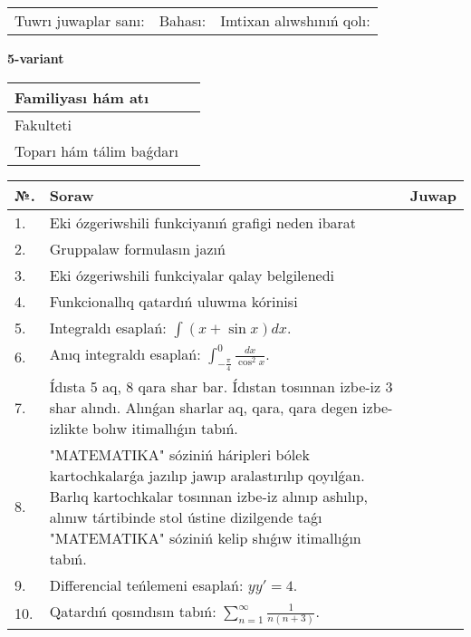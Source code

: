 \documentclass{article}
\begin{document}
\vspace{1cm}

\begin{tabular}{ c c c }
Tuwrı juwaplar sanı: \underline{\hspace{2cm}} & Bahası: \underline{\hspace{2cm}} & Imtixan alıwshınıń qolı: \underline{\hspace{2cm}} \\
\end{tabular}

\newpage

\begin{center}\textbf{5-variant}\end{center}

\bgroup
\def\arraystretch{1.5}
\begin{tabular}{ |m{6cm}|m{10cm}| }
  \hline
  Familiyası hám atı & \\
  \hline
  Fakulteti &\\
  \hline
  Toparı hám tálim baǵdarı & \\
  \hline
\end{tabular}
\egroup

\vspace{0.5cm}

\bgroup
\def\arraystretch{2}
\begin{tabular}{ |l|m{8cm}|m{7cm}| }
  \hline
  №. & Soraw & Juwap \\
  \hline
  1. & Eki ózgeriwshili funkciyanıń grafigi neden ibarat &  \\
  \hline
  2. & Gruppalaw formulasın jazıń &  \\
  \hline
  3. & Eki ózgeriwshili funkciyalar qalay belgilenedi &  \\
  \hline
  4. & Funkcionallıq qatardıń uluwma kórinisi &  \\
  \hline
  5. & Integraldı esaplań: $\displaystyle\int (x + \sin x)dx$. &  \\
  \hline
  6. & Anıq integraldı esaplań: $\displaystyle\int_{-\frac{\pi}{4}}^{0}\frac{dx}{\cos^{2}x}$. &  \\
  \hline
  7. & Ídısta 5 aq, 8 qara shar bar. Ídıstan tosınnan izbe-iz 3 shar alındı. Alınǵan sharlar aq, qara, qara degen izbe-izlikte bolıw itimallıǵın tabıń. &  \\
  \hline
  8. & "MATEMATIKA" sóziniń háripleri bólek kartochkalarǵa jazılıp jawıp aralastırılıp qoyılǵan. Barlıq kartochkalar tosınnan izbe-iz alınıp ashılıp, alınıw tártibinde stol ústine dizilgende taǵı "MATEMATIKA" sóziniń kelip shıǵıw itimallıǵın tabıń. &  \\
  \hline
  9. & Differencial teńlemeni esaplań: $yy'= 4$. &  \\
  \hline
  10. & Qatardıń qosındısın tabıń: $\displaystyle\sum_{n = 1}^{\infty}\frac{1}{n(n + 3)}$. &  \\
  \hline
\end{tabular}
\egroup
\end{document}
